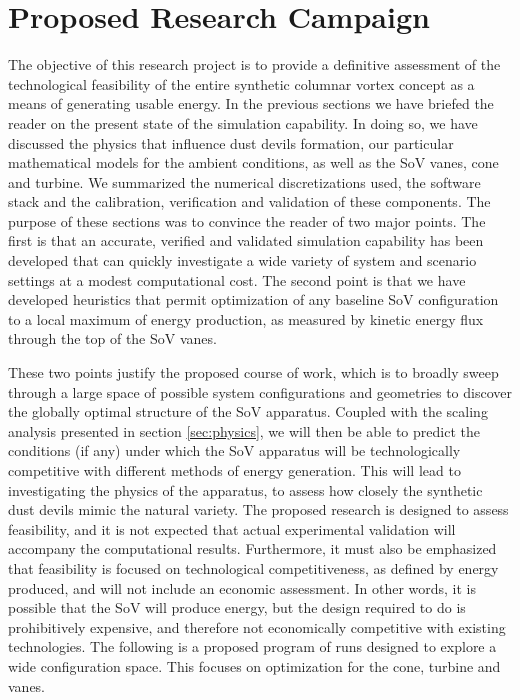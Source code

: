 \section{Proposed Research Campaign}
\label{sec:proposed_work}


The objective of this research project is to provide a definitive
assessment of the technological feasibility of the entire synthetic
columnar vortex concept as a means of generating usable energy. In the 
previous sections we have briefed the reader on the present state of the
simulation capability. In doing so, we have discussed the physics that
influence dust devils formation, our particular mathematical
models for the ambient conditions, as well as the SoV vanes, cone and
turbine. We summarized the numerical discretizations used, the software
stack and the calibration, verification and validation of these
components. The purpose of these sections was to convince the reader of
two major points. The first is that an accurate, verified and
validated simulation capability has been developed that can quickly
investigate a wide variety of system and scenario settings at a modest
computational cost. The second point is that we have developed
heuristics that permit optimization of any baseline SoV configuration to
a local maximum of energy production, as measured by kinetic energy flux
through the top of the SoV vanes.  

These two points justify the proposed course of work, which is to
broadly sweep through a large space of possible system configurations
and geometries to discover the globally optimal structure
of the SoV apparatus. Coupled with the scaling analysis presented in
section \ref{sec:physics}, we will then be able to predict the
conditions (if any) under which the SoV apparatus will be
technologically competitive with different methods of energy
generation. This will lead to investigating the physics of the
apparatus, to assess how closely the synthetic dust devils mimic the
natural variety. The proposed research is designed to
assess feasibility, and it is not expected that actual experimental
validation will accompany the computational results. Furthermore, it
must also be emphasized that feasibility is focused on
technological competitiveness, as defined by energy produced, and will
not include an economic assessment. In other words, it is possible that
the SoV will produce energy, but the design required to do is
prohibitively expensive, and therefore not economically competitive with
existing technologies. The following is a proposed program of runs
designed to explore a wide configuration space. This focuses on
optimization for the cone, turbine and vanes. 


